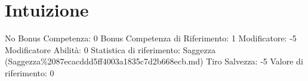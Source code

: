 \section{Intuizione}\label{intuizione}

\begin{description}
\tightlist
\item[Tags: ABI]
No Bonus Competenza: 0 Bonus Competenza di Riferimento: 1 Modificatore:
-5 Modificatore Abilità: 0 Statistica di riferimento: Saggezza
(Saggezza\%2087ecacddd5ff4003a1835c7d2b668ecb.md) Tiro Salvezza: -5
Valore di riferimento: 0
\end{description}
